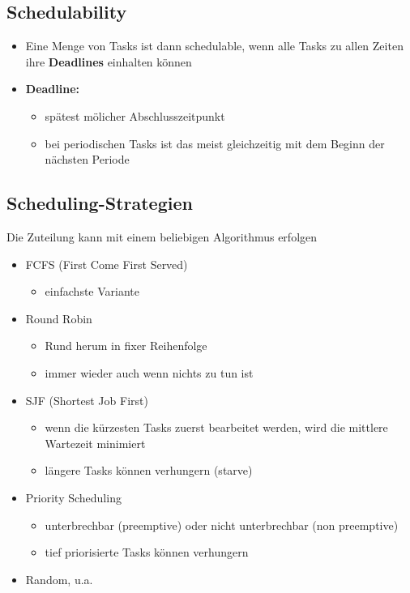 \subsection{Schedulability}
\begin{itemize}
  \item Eine Menge von Tasks ist dann schedulable, wenn alle Tasks zu allen Zeiten ihre \textbf{Deadlines} einhalten können
  \item \textbf{Deadline:}
        \begin{itemize}
          \item spätest mölicher Abschlusszeitpunkt
          \item bei periodischen Tasks ist das meist gleichzeitig mit dem Beginn der nächsten Periode
        \end{itemize}
\end{itemize}

\subsection{Scheduling-Strategien}
Die Zuteilung kann mit einem beliebigen Algorithmus erfolgen
\begin{itemize}[noitemsep,topsep=0pt]
  \item FCFS (First Come First Served)
        \begin{itemize}
          \item einfachste Variante
        \end{itemize}
  \item Round Robin
        \begin{itemize}
          \item Rund herum in fixer Reihenfolge
          \item immer wieder auch wenn nichts zu tun ist
        \end{itemize}
  \item SJF (Shortest Job First)
        \begin{itemize}
          \item wenn die kürzesten Tasks zuerst bearbeitet werden, wird die mittlere Wartezeit minimiert
          \item längere Tasks können verhungern (starve)
        \end{itemize}
  \item Priority Scheduling
        \begin{itemize}
          \item unterbrechbar (preemptive) oder nicht unterbrechbar (non preemptive)
          \item tief priorisierte Tasks können verhungern
        \end{itemize}
  \item Random, u.a.
\end{itemize}

